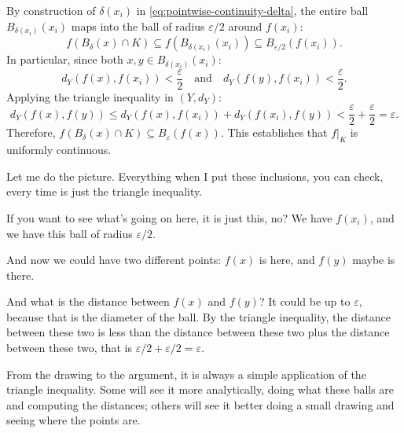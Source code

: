 \begin{proofWrapper}
\begin{content}
By construction of $\delta(x_i)$ in \eqref{eq:pointwise-continuity-delta}, the entire ball $B_{\delta(x_i)}(x_i)$ maps into the ball of radius $\varepsilon/2$ around $f(x_i)$:
\begin{equation}\label{eq:image-inclusions}
f(B_\delta(x) \cap K) \subseteq f(B_{\delta(x_i)}(x_i)) \subseteq B_{\varepsilon/2}(f(x_i)).
\end{equation}
In particular, since both $x, y \in B_{\delta(x_i)}(x_i)$:
\[
d_Y(f(x), f(x_i)) < \frac{\varepsilon}{2} \quad \text{and} \quad d_Y(f(y), f(x_i)) < \frac{\varepsilon}{2}.
\]
Applying the triangle inequality in $(Y, d_Y)$:
\begin{equation}\label{eq:triangle-y-bound}
d_Y(f(x), f(y)) \le d_Y(f(x), f(x_i)) + d_Y(f(x_i), f(y)) < \frac{\varepsilon}{2} + \frac{\varepsilon}{2} = \varepsilon.
\end{equation}
Therefore, $f(B_\delta(x) \cap K) \subseteq B_\varepsilon(f(x))$. This establishes that $f|_K$ is uniformly continuous.
\end{content}

\begin{speech}[01:23:42 - 01:25:10]
Let me do the picture. Everything when I put these inclusions, you can check, every time is just the triangle inequality.


If you want to see what's going on here, it is just this, no? We have $f(x_i)$, and we have this ball of radius $\varepsilon/2$.

And now we could have two different points: $f(x)$ is here, and $f(y)$ maybe is there.

And what is the distance between $f(x)$ and $f(y)$? It could be up to $\varepsilon$, because that is the diameter of the ball. By the triangle inequality, the distance between these two is less than the distance between these two plus the distance between these two, that is $\varepsilon/2 + \varepsilon/2 = \varepsilon$.

From the drawing to the argument, it is always a simple application of the triangle inequality. Some will see it more analytically, doing what these balls are and computing the distances; others will see it better doing a small drawing and seeing where the points are.


\end{speech}
\end{proofWrapper}
